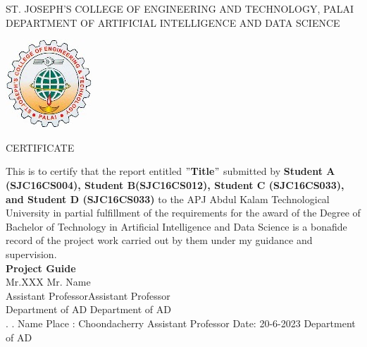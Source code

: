 \newpage
\thispagestyle{empty}
\begin{center}
\normalsize{ST. JOSEPH’S COLLEGE OF ENGINEERING AND TECHNOLOGY, PALAI}\\[0.5cm]
\normalsize
 { DEPARTMENT OF ARTIFICIAL INTELLIGENCE AND DATA SCIENCE}\\[1.0cm]%
   \begin{center}
   \includegraphics{Images/SJCET_logo.jpg}
   \end{center}
{\large CERTIFICATE}\\[1.5cm]
\end{center}
\normalsize 
This is to certify that the report entitled {\bf $"$Title$"$} submitted by { \bf Student A (SJC16CS004), Student B(SJC16CS012), Student C (SJC16CS033), and Student D (SJC16CS033)} to the APJ Abdul Kalam Technological University in partial fulfillment of the requirements for the award of the Degree of Bachelor of Technology in Artificial Intelligence and Data Science is a bonafide record of the project work carried out by them under my guidance and supervision.\vspace{1.3 cm}\\
{\bf Project Guide}\hspace{8.4 cm}{\bf Project Coordinator}\\
Mr.XXX\hspace{9.6 cm} Mr. Name\\
Assistant Professor\hspace{8.0 cm}Assistant Professor\hspace{2.8 cm}\\Department of 
 AD\hspace{7.9 cm} Department of AD
\vspace{1.3 cm}\\
.\hspace{11.25 cm}{ \bf Head of Department}
\newline
.\hspace{11.25 cm} Name
\newline
Place : Choondacherry  \hspace{7.12 cm} Assistant Professor
\newline
Date\hspace{0.25 cm}: 20-6-2023 \hspace{8.05 cm} Department of AD
                
